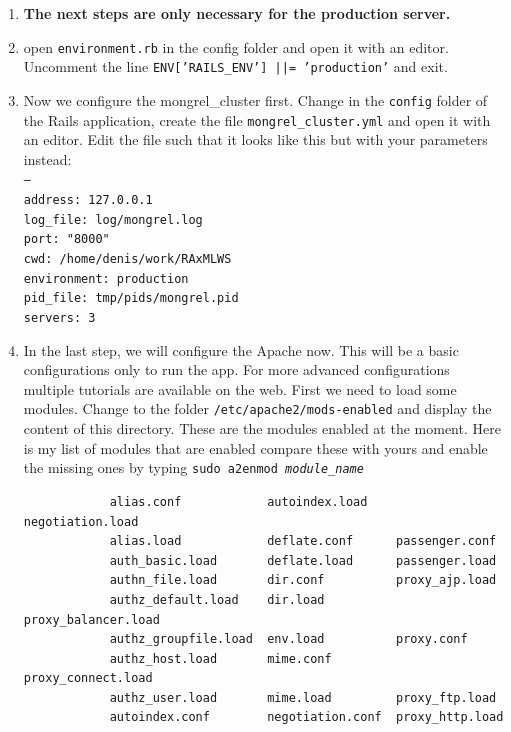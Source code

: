 \documentclass{scrartcl}
\begin{document}
			\begin{enumerate}
			\item[] \textbf{The next steps are only necessary for the production server.}
			\item open \texttt{environment.rb} in the config folder and open it with an editor. Uncomment the line \texttt{ENV['RAILS\_ENV'] ||= 'production'} and  exit.
			\item Now we configure the mongrel\_cluster first. Change in the \texttt{config} folder of the Rails application, create the file \texttt{mongrel\_cluster.yml} and open it with an editor. Edit the file such that it looks like this but with your parameters instead:\\
			\texttt{---\\                                                                             
			address: 127.0.0.1\\                                                              
			log\_file: log/mongrel.log\\                                                       
			port: "8000"\\                                                                    
			cwd: /home/denis/work/RAxMLWS\\                                                   
			environment: production\\                                                         
			pid\_file: tmp/pids/mongrel.pid\\                                                 
			servers: 3}
			
			\item In the last step, we will configure the Apache now. This will be a basic configurations only to run the app. For more advanced configurations multiple tutorials are available on the web. First we need to load some modules. Change to the folder \texttt{/etc/apache2/mods-enabled} and display the content of this directory. These are the modules enabled at the moment. Here is my list of modules that are enabled compare these with yours and enable the missing ones by typing \texttt{sudo a2enmod \textit{module\_name}}
			\begin{verbatim}
			alias.conf            autoindex.load    negotiation.load     
			alias.load            deflate.conf      passenger.conf       
			auth_basic.load       deflate.load      passenger.load       
			authn_file.load       dir.conf          proxy_ajp.load       
			authz_default.load    dir.load          proxy_balancer.load  
			authz_groupfile.load  env.load          proxy.conf           
			authz_host.load       mime.conf         proxy_connect.load   
			authz_user.load       mime.load         proxy_ftp.load       
			autoindex.conf        negotiation.conf  proxy_http.load      
			\end{verbatim}
			

\end{enumerate}
\end{document}
